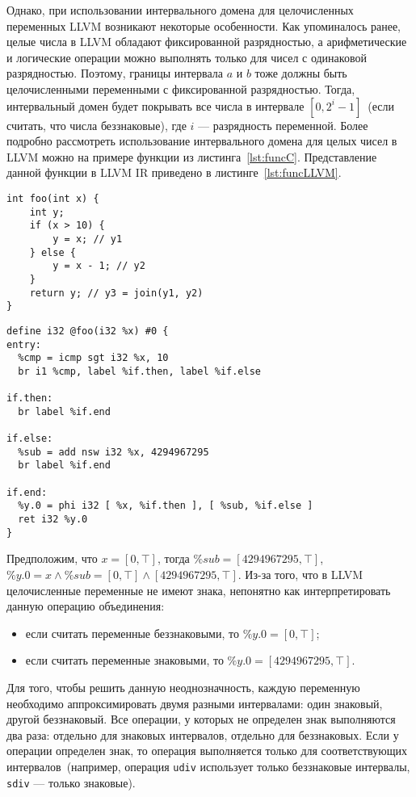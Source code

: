 Однако, при использовании интервального домена для целочисленных переменных 
LLVM возникают некоторые особенности. Как упоминалось ранее, целые числа в 
LLVM обладают фиксированной разрядностью, а арифметические и логические 
операции можно выполнять только для чисел с одинаковой разрядностью. Поэтому, 
границы интервала $a$ и $b$ тоже должны быть целочисленными переменными с 
фиксированной разрядностью. Тогда, интервальный домен будет покрывать все 
числа в интервале $[0, 2^i - 1]$~(если считать, что числа беззнаковые), где
$i$ --- разрядность переменной. Более подробно рассмотреть использование
интервального домена для целых чисел в LLVM можно на примере функции из 
листинга~\ref{lst:funcC}. Представление данной функции в LLVM IR приведено в
листинге~\ref{lst:funcLLVM}.

\begin{lstlisting}[style=c, caption={Пример функции на языке С}, 
label=lst:funcC]
int foo(int x) {
    int y;
    if (x > 10) {
        y = x; // y1
    } else {
        y = x - 1; // y2
    }
    return y; // y3 = join(y1, y2)
}
\end{lstlisting}

\begin{lstlisting}[style=llvm, caption={Представление функции из 
    листинга~\ref{lst:funcC} в LLVM IR}, label=lst:funcLLVM]
define i32 @foo(i32 %x) #0 {
entry:
  %cmp = icmp sgt i32 %x, 10
  br i1 %cmp, label %if.then, label %if.else

if.then:
  br label %if.end

if.else:
  %sub = add nsw i32 %x, 4294967295
  br label %if.end

if.end:
  %y.0 = phi i32 [ %x, %if.then ], [ %sub, %if.else ]
  ret i32 %y.0
}
\end{lstlisting}

Предположим, что $x = [0, \top]$, тогда $\%sub = [4294967295, \top]$, $\%y.0 = 
x \wedge \%sub = [0, \top] \wedge [4294967295, \top]$. Из-за того, что в LLVM 
целочисленные переменные не имеют знака, непонятно как интерпретировать данную
операцию объединения:
\begin{itemize}
\item если считать переменные беззнаковыми, то $\%y.0 = [0, \top]$;
\item если считать переменные знаковыми, то $\%y.0 = [4294967295, \top]$.
\end{itemize}

Для того, чтобы решить данную неоднозначность, каждую переменную необходимо
аппроксимировать двумя разными интервалами: один знаковый, другой беззнаковый.
Все операции, у которых не определен знак выполняются два раза: отдельно для
знаковых интервалов, отдельно для беззнаковых. Если у операции определен знак,
то операция выполняется только для соответствующих интервалов~(например, 
операция \texttt{udiv} использует только беззнаковые интервалы, 
\texttt{sdiv} --- только знаковые).


